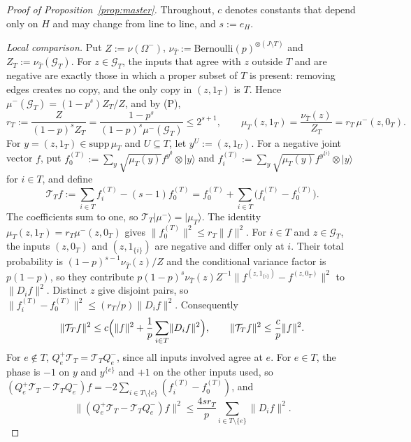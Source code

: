 \documentclass[11pt]{article}
\theoremstyle{remark}
\newcommand{\norm}[1]{\lVert #1\rVert}
\newcommand{\ket}[1]{\lvert #1\rangle}
\newcommand{\Ev}{\mathcal{G}}
\begin{document}
\begin{proof}[Proof of Proposition~\ref{prop:master}]
Throughout, $c$ denotes constants that depend only on $H$ and may change from line to line, and $s:=e_H$.

\emph{Local comparison.} Put $Z:=\nu(\Omega^-)$, $\nu_{\bar T}:=\mathrm{Bernoulli}(p)^{\otimes(J\setminus T)}$ and $Z_T:=\nu_{\bar T}(\Ev_T)$. For $z\in\Ev_T$, the inputs that agree with $z$ outside $T$ and are negative are exactly those in which a proper subset of $T$ is present: removing edges creates no copy, and the only copy in $(z,1_T)$ is $T$. Hence $\mu^-(\Ev_T)=(1-p^s)Z_T/Z$, and by (P),
\[r_T:=\frac{Z}{(1-p)^sZ_T}=\frac{1-p^s}{(1-p)^s\mu^-(\Ev_T)}\le2^{s+1},\qquad\mu_T(z,1_T)=\frac{\nu_{\bar T}(z)}{Z_T}=r_T\,\mu^-(z,0_T).\]
For $y=(z,1_T)\in\mathrm{supp}\,\mu_T$ and $U\subseteq T$, let $y^U:=(z,1_U)$. For a negative joint vector $f$, put $f_0^{(T)}:=\sum_y\sqrt{\mu_T(y)}f^{y^\emptyset}\otimes\ket y$ and $f_i^{(T)}:=\sum_y\sqrt{\mu_T(y)}f^{y^{\{i\}}}\otimes\ket y$ for $i\in T$, and define
\[\mathcal T_Tf:=\sum_{i\in T}f_i^{(T)}-(s-1)f_0^{(T)}=f_0^{(T)}+\sum_{i\in T}\bigl(f_i^{(T)}-f_0^{(T)}\bigr).\]
The coefficients sum to one, so $\mathcal T_T\ket{\mu^-}=\ket{\mu_T}$. The identity $\mu_T(z,1_T)=r_T\mu^-(z,0_T)$ gives $\norm{f_0^{(T)}}^2\le r_T\norm f^2$. For $i\in T$ and $z\in\Ev_T$, the inputs $(z,0_T)$ and $(z,1_{\{i\}})$ are negative and differ only at $i$. Their total probability is $(1-p)^{s-1}\nu_{\bar T}(z)/Z$ and the conditional variance factor is $p(1-p)$, so they contribute $p(1-p)^s\nu_{\bar T}(z)Z^{-1}\norm{f^{(z,1_{\{i\}})}-f^{(z,0_T)}}^2$ to $\norm{D_if}^2$. Distinct $z$ give disjoint pairs, so $\norm{f_i^{(T)}-f_0^{(T)}}^2\le(r_T/p)\norm{D_if}^2$. Consequently
\begin{equation}\label{eq:local}
\norm{\mathcal T_Tf}^2\le c\Bigl(\norm f^2+\frac1p\sum_{i\in T}\norm{D_if}^2\Bigr),\qquad\norm{\mathcal T_Tf}^2\le\frac cp\norm f^2.
\end{equation}
For $e\notin T$, $Q_e^+\mathcal T_T=\mathcal T_TQ_e^-$, since all inputs involved agree at $e$. For $e\in T$, the phase is $-1$ on $y$ and $y^{\{e\}}$ and $+1$ on the other inputs used, so $(Q_e^+\mathcal T_T-\mathcal T_TQ_e^-)f=-2\sum_{i\in T\setminus\{e\}}(f_i^{(T)}-f_0^{(T)})$, and
\begin{equation}\label{eq:qerr}
\norm{(Q_e^+\mathcal T_T-\mathcal T_TQ_e^-)f}^2\le\frac{4sr_T}p\sum_{i\in T\setminus\{e\}}\norm{D_if}^2.
\end{equation}


\end{proof}
\end{document}
